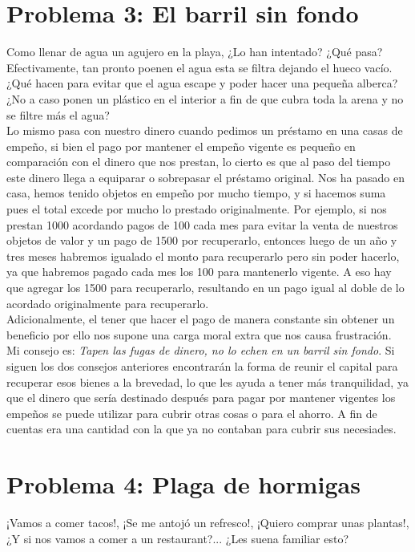 \documentclass[12pt]{book} %
\begin{document}
\chapter[El barril sin fondo]{Problema 3: El barril sin fondo}
Como llenar de agua un agujero en la playa, ¿Lo han intentado? ¿Qué pasa? Efectivamente, tan pronto poenen el agua esta se filtra dejando el hueco vacío. ¿Qué hacen para evitar que el agua escape y poder hacer una pequeña alberca? ¿No a caso ponen un plástico en el interior a fin de que cubra toda la arena y no se filtre más el agua?\\

Lo mismo pasa con nuestro dinero cuando pedimos un préstamo en una casas de empeño, si bien el pago por mantener el empeño vigente es pequeño en comparación con el dinero que nos prestan, lo cierto es que al paso del tiempo este dinero llega a equiparar o sobrepasar el préstamo original. Nos ha pasado en casa, hemos tenido objetos en empeño por mucho tiempo, y si hacemos suma pues el total excede por mucho lo prestado originalmente. Por ejemplo, si nos prestan 1000 acordando pagos de 100 cada mes para evitar la venta de nuestros objetos de valor y un pago de 1500 por recuperarlo, entonces luego de un año y tres meses habremos igualado el monto para recuperarlo pero sin poder hacerlo, ya que habremos pagado cada mes los 100 para mantenerlo vigente. A eso hay que agregar los 1500 para recuperarlo, resultando en un pago igual al doble de lo acordado originalmente para recuperarlo.\\

Adicionalmente, el tener que hacer el pago de manera constante sin obtener un beneficio por ello nos supone una carga moral extra que nos causa frustración.\\

Mi consejo es: \emph{Tapen las fugas de dinero, no lo echen en un barril sin fondo}. Si siguen los dos consejos anteriores encontrarán la forma de reunir el capital para recuperar esos bienes a la brevedad, lo que les ayuda a tener más tranquilidad, ya que el dinero que sería destinado después para pagar por mantener vigentes los empeños se puede utilizar para cubrir otras cosas o para el ahorro. A fin de cuentas era una cantidad con la que ya no contaban para cubrir sus necesiades.

\chapter[Plaga de hormigas]{Problema 4: Plaga de hormigas}
¡Vamos a comer tacos!, ¡Se me antojó un refresco!, ¡Quiero comprar unas plantas!, ¿Y si nos vamos a comer a un restaurant?... ¿Les suena familiar esto?\\
\end{document}
